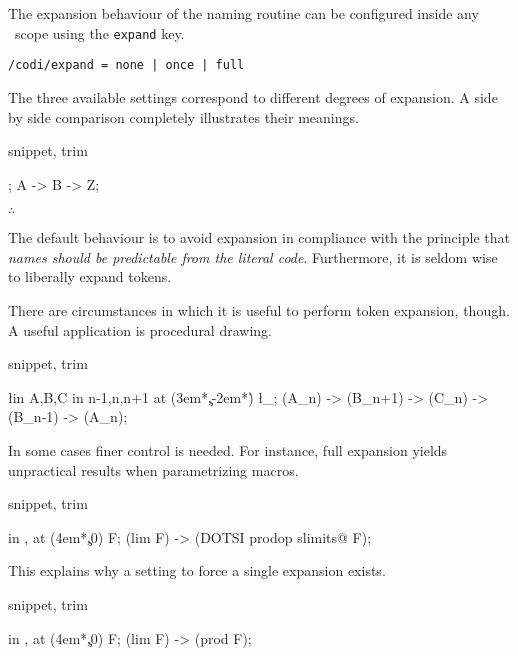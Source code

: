 The expansion behaviour of the naming routine can be configured
inside any \CoDi\ scope using the \lstinline!expand! key.

\begin{lstlisting}
/codi/expand = none | once | full
\end{lstlisting}

The three available settings correspond to different degrees of expansion.
A side by side comparison completely illustrates their meanings.

\begin{tcblisting}{snippet, trim}
\begin{codi}
\def\B{Z}
\def\A{\B}
\obj{ |[expand=none]| \A &     %
      |[expand=once]| \A &     %
      |[expand=full]| \A \\ }; %
\mor A -> B -> Z;
\end{codi}
\end{tcblisting}

\hfill$\therefore$\hfill\null

The default behaviour is to avoid expansion in compliance with the principle
that \emph{names should be predictable from the \emph{literal} code}.
Furthermore, it is seldom wise to liberally expand tokens.

There are circumstances in which it is useful to perform token expansion,
though. A useful application is procedural drawing.

\begin{tcblisting}{snippet, trim}
\begin{codi}
\foreach [count=\r] \l in {A,B,C}
  \foreach [count=\c] \n in {n-1,n,n+1}
    \obj [expand=full] at (3em*\c,-2em*\r) {\l_{\n}};
\mor (A_{n}) -> (B_{n+1}) -> (C_{n}) -> (B_{n-1}) -> (A_{n});
\end{codi}
\end{tcblisting}

In some cases finer control is needed. For instance, full expansion
yields unpractical results when parametrizing macros.

\begin{tcblisting}{snippet, trim}
\begin{codi}
\foreach [count=\c] \m in {\lim,\prod}
  \obj [expand=full] at (4em*\c,0) {\m F};
\mor (lim F) -> (DOTSI prodop slimits@ F);
\end{codi}
\end{tcblisting}

This explains why a setting to force a single expansion exists.

\begin{tcblisting}{snippet, trim}
\begin{codi}
\foreach [count=\c] \m in {\lim,\prod}
  \obj [expand=once] at (4em*\c,0) {\m F};
\mor (lim F) -> (prod F);
\end{codi}
\end{tcblisting}
